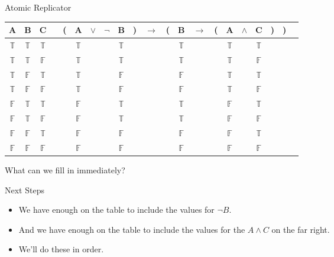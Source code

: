 \documentclass[
  ignorenonframetext,
]{beamer}
\providecommand{\tightlist}{%
  \setlength{\itemsep}{0pt}\setlength{\parskip}{0pt}}
\renewcommand{\,}{\text{, }}
\def\True{\mathbb{T}}
\def\False{\mathbb{F}}
\begin{document}
\begin{frame}{Atomic Replicator}
\protect\hypertarget{atomic-replicator}{}

\begin{center}
\begin{tabular}{@{ }c@{ }@{ }c@{ }@{ }c | c@{ }@{}c@{}@{ }c@{ }@{ }c@{ }@{ }c@{ }@{ }c@{ }@{}c@{}@{ }c@{ }@{}c@{}@{ }c@{ }@{ }c@{ }@{}c@{}@{ }c@{ }@{ }c@{ }@{ }c@{ }@{}c@{}@{}c@{}@{ }c}
A & B & C &  & ( & A & $\vee$ & $\neg$ & B & ) & $\rightarrow$ & ( & B & $\rightarrow$ & ( & A & $\wedge$ & C & ) & ) & \\
\hline 
 $\True$ & $\True$ & $\True$ &  &  & $\True$ &&& $\True$ &  &&  & $\True$ &&  & $\True$ && $\True$ &  &  & \\
 $\True$ & $\True$ & $\False$ &  &  & $\True$ &&& $\True$ &  &&  & $\True$ &&  & $\True$ && $\False$ &  &  & \\
 $\True$ & $\False$ & $\True$ &  &  & $\True$ &&& $\False$ &  &&  & $\False$ &&  & $\True$ && $\True$ &  &  & \\
 $\True$ & $\False$ & $\False$ &  &  & $\True$ &&& $\False$ &  &&  & $\False$ &&  & $\True$ && $\False$ &  &  & \\
 $\False$ & $\True$ & $\True$ &  &  & $\False$ &&& $\True$ &  &&  & $\True$ &&  & $\False$ && $\True$ &  &  & \\
 $\False$ & $\True$ & $\False$ &  &  & $\False$ &&& $\True$ &  &&  & $\True$ &&  & $\False$ && $\False$ &  &  & \\
 $\False$ & $\False$ & $\True$ &  &  & $\False$ &&& $\False$ &  &&  & $\False$ &&  & $\False$ && $\True$ &  &  & \\
 $\False$ & $\False$ & $\False$ &  &  & $\False$ &&& $\False$ &  &&  & $\False$ &&  & $\False$ && $\False$ &  &  & \\
\end{tabular}
\bigskip
\end{center}

What can we fill in immediately?

\end{frame}

\begin{frame}{Next Steps}
\protect\hypertarget{next-steps}{}

\begin{itemize}
\tightlist
\item
  We have enough on the table to include the values for \(\neg B\).
\item
  And we have enough on the table to include the values for the
  \(A \wedge C\) on the far right.
\item
  We'll do these in order.
\end{itemize}

\end{frame}
\end{document}
